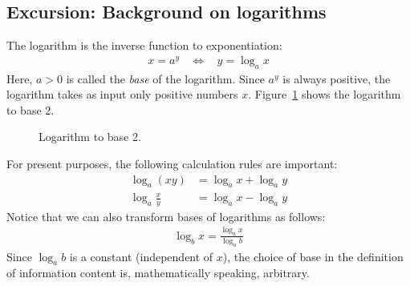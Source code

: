 \documentclass[nobib,nofonts]{tufte-handout}
\begin{document}
\subsection{Excursion: Background on logarithms}

The logarithm is the inverse function to exponentiation:
\begin{align*}
   x = a^{y} \ \ \ \  \Leftrightarrow  \ \ \ \  y = \log_{a} x
\end{align*}
Here, $a > 0$ is called the \emph{base} of the logarithm.
Since $a^{y}$ is always positive, the logarithm takes as input only positive numbers $x$.
Figure~\ref{fig:logarithm} shows the logarithm to base 2.

\begin{figure}
  \centering

\caption{Logarithm to base 2.}
\label{fig:logarithm}
\end{figure}

For present purposes, the following calculation rules are important:
\begin{align*}
  \log_{a}( x y ) & = \log_{a} x + \log_{a} y \\
  \log_{a} \frac{x}{y} & = \log_{a} x - \log_{a} y
\end{align*}
Notice that we can also transform bases of logarithms as follows:
\begin{align*}
  \log_{b} x = \frac{\log_{a} x}{\log_{a} b}
\end{align*}
Since $\log_{a} b$ is a constant (independent of $x$), the choice of base in the definition of information content is, mathematically speaking, arbitrary.
\end{document}

